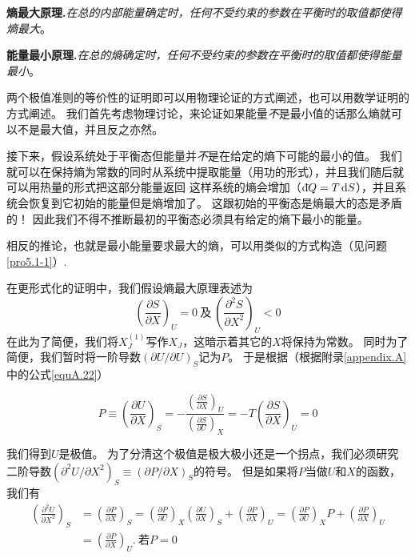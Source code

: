 {\bf 熵最大原理.}{\it 在总的内部能量确定时，任何不受约束的参数在平衡时的取值都使得熵最大}。

{\bf 能量最小原理.}{\it 在总的熵确定时，任何不受约束的参数在平衡时的取值都使得能量最小}。

两个极值准则的等价性的证明即可以用物理论证的方式阐述，也可以用数学证明的方式阐述。
我们首先考虑物理讨论，来论证如果能量{\it 不}是最小值的话那么熵就可以不是最大值，并且反之亦然。

接下来，假设系统处于平衡态但能量并{\it 不}是在给定的熵下可能的最小的值。
我们就可以在保持熵为常数的同时从系统中提取能量（用功的形式），并且我们随后就可以用热量的形式把这部分能量返回
这样系统的熵会增加（$\mathrm d\hspace*{-0.1em}\bar{}\hspace*{0.08em} Q=T\,\mathrm dS$），并且系统会恢复到它初始的能量但是熵增加了。
这跟初始的平衡态是熵最大的态是矛盾的！
因此我们不得不推断最初的平衡态必须具有给定的熵下最小的能量。

相反的推论，也就是最小能量要求最大的熵，可以用类似的方式构造（见问题 \ref{pro5.1-1}）.

在更形式化的证明中，我们假设熵最大原理表述为
\begin{equation}
\label{equ5.1}
\left(\frac{\partial S}{\partial X}\right)_U=0
~\text{及}~
\left(\frac{\partial^2 S}{\partial X^2}\right)_U<0
\end{equation}
在此为了简便，我们将$X_J^{(1)}$写作$X_J$，这暗示着其它的$X$将保持为常数。
同时为了简便，我们暂时将一阶导数$(\partial U/\partial U)_S$记为$P$。
于是根据（根据附录\ref{appendix.A}中的公式\eqref{equA.22}）

\begin{equation}
\label{equ5.2}
	P \equiv \left( \frac{\partial U}{\partial X} \right)_S = -\frac{\left( \frac{\partial S}{\partial X} \right)_U }{ \left( \frac{\partial S}{\partial U}\right)_X } = -T \left(\frac{\partial S}{\partial X}\right)_U = 0
\end{equation}

我们得到$U$是极值。
为了分清这个极值是极大极小还是一个拐点，我们必须研究二阶导数$(\partial^2U/\partial X^2)_S\equiv(\partial P/\partial X)_S$的符号。
但是如果将$P$当做$U$和$X$的函数，我们有
\begin{align}
\label{equ5.3}
\left(\frac{\partial^2 U}{\partial X^2}\right)_S
&=\left(\frac{\partial P}{\partial X}\right)_S
=\left(\frac{\partial P}{\partial U}\right)_X
\left(\frac{\partial U}{\partial X}\right)_S
+\left(\frac{\partial P}{\partial X}\right)_U
=\left(\frac{\partial P}{\partial U}\right)_XP
+\left(\frac{\partial P}{\partial X}\right)_U \\
\label{equ5.4}
&=\left(\frac{\partial P}{\partial X}\right)_U.~\text{若}P=0
\end{align}

